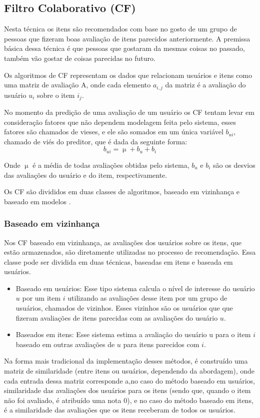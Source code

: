 \subsection{Filtro Colaborativo (CF)}
Nesta técnica os itens são recomendados com base no gosto de um grupo de pessoas que fizeram boas avaliação de itens parecidos anteriormente. A premissa básica dessa técnica é que pessoas que gostaram da mesmas coisas no passado, também vão gostar de coisas parecidas no futuro\cite{shah2017recommender}.

Os algoritmos de CF  representam os dados que relacionam usuários e itens como uma matriz de avaliação A, onde cada elemento \(a_{i,j}\) da matriz é a avaliação do usuário \(u_i\) sobre o item \(i_j\)\cite{sarwar2001item}.

No momento da predição de uma avaliação de um usuário os CF tentam levar em consideração fatores que não dependem modelagem feita pelo sistema, esses fatores são chamados de vieses, e ele são somados em um única variável \(b_{ui}\), chamado de viés do preditor, que é dada da seguinte forma:
\begin{equation}
    b_{ui} = \upmu + b_u + b_i 
\end{equation}

Onde \(\upmu\) é a média de todas avaliações obtidas pelo sistema, \(b_u\) e \(b_i\) são os desvios das avaliações do usuário e do item, respectivamente.

Os CF são divididos em duas classes de algoritmos, baseado em vizinhança e baseado em modelos \cite{koren2015advances}.

\subsubsection{Baseado em vizinhança}
Nos CF baseado em vizinhança, as avaliações dos  usuários sobre os itens, que estão armazenados, são diretamente utilizadas no processo de recomendação. Essa classe pode ser dividida em duas técnicas, baseadas em itens e baseada em usuários. 
\begin{itemize}
    \item Baseado em  usuários: Esse tipo sistema calcula o nível de interesse do usuário \(u\) por um item \(i\) utilizando as avaliações desse item por um grupo de usuários, chamados de vizinhos. Esses vizinhos são os usuários que que fizeram avaliações de itens parecidas com as  avaliações do usuário \(u\).
    \item Baseados em itens: Esse sistema estima a avaliação do usuário u para o item \(i\) baseado em outras avaliações de  \(u\) para itens parecidos com \(i\). 

\end{itemize}
Na forma mais tradicional da implementação desses métodos, é construído uma matriz de similaridade (entre itens ou usuários, dependendo da abordagem), onde cada entrada dessa matriz corresponde a,no caso do método baseado em usuários, similaridade das avaliações dos usuários para os itens (sendo  que, quando o item não foi avaliado, é atribuído uma nota 0), e no caso do método baseado em itens, é a similaridade das avaliações que os itens receberam de todos os usuários.


